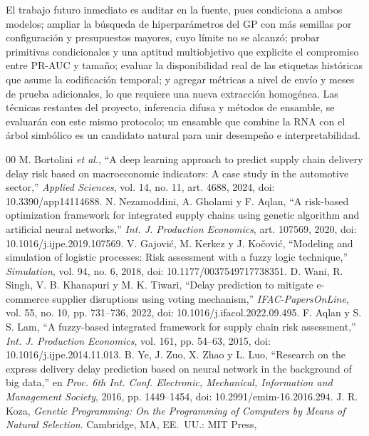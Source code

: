 \documentclass[conference]{IEEEtran}
\newcommand{\col}[1]{\texttt{\detokenize{#1}}}
\begin{document}
El trabajo futuro inmediato es auditar \col{DOM_DOMAIN_ID} en la fuente, pues
condiciona a ambos modelos; ampliar la búsqueda de hiperparámetros del GP con
más semillas por configuración y presupuestos mayores, cuyo límite no se
alcanzó; probar primitivas condicionales y una aptitud multiobjetivo que
explicite el compromiso entre PR-AUC y tamaño; evaluar la disponibilidad real
de las etiquetas históricas que asume la codificación temporal; y agregar
métricas a nivel de envío y meses de prueba adicionales, lo que requiere una
nueva extracción homogénea. Las técnicas restantes del proyecto, inferencia
difusa y métodos de ensamble, se evaluarán con este mismo protocolo; un
ensamble que combine la RNA con el árbol simbólico es un candidato natural
para unir desempeño e interpretabilidad.

\begin{thebibliography}{00}
 M. Bortolini \textit{et al.}, ``A deep learning approach to
predict supply chain delivery delay risk based on macroeconomic indicators: A
case study in the automotive sector,'' \textit{Applied Sciences}, vol. 14,
no. 11, art. 4688, 2024, doi: 10.3390/app14114688.
 N. Nezamoddini, A. Gholami y F. Aqlan, ``A risk-based
optimization framework for integrated supply chains using genetic algorithm
and artificial neural networks,'' \textit{Int. J. Production Economics},
art. 107569, 2020, doi: 10.1016/j.ijpe.2019.107569.
 V. Gajović, M. Kerkez y J. Kočović, ``Modeling and
simulation of logistic processes: Risk assessment with a fuzzy logic
technique,'' \textit{Simulation}, vol. 94, no. 6, 2018,
doi: 10.1177/0037549717738351.
 D. Wani, R. Singh, V. B. Khanapuri y M. K. Tiwari,
``Delay prediction to mitigate e-commerce supplier
disruptions using voting mechanism,'' \textit{IFAC-PapersOnLine}, vol. 55,
no. 10, pp. 731--736, 2022, doi: 10.1016/j.ifacol.2022.09.495.
 F. Aqlan y S. S. Lam, ``A fuzzy-based integrated framework for
supply chain risk assessment,'' \textit{Int. J. Production Economics},
vol. 161, pp. 54--63, 2015, doi: 10.1016/j.ijpe.2014.11.013.
 B. Ye, J. Zuo, X. Zhao y L. Luo, ``Research on the express
delivery delay prediction based on neural network in the background of big
data,'' en \textit{Proc. 6th Int. Conf. Electronic, Mechanical, Information
and Management Society}, 2016, pp. 1449--1454, doi: 10.2991/emim-16.2016.294.
 J. R. Koza, \textit{Genetic Programming: On the Programming of
Computers by Means of Natural Selection}. Cambridge, MA, EE.~UU.: MIT Press,

\end{thebibliography}
\end{document}
